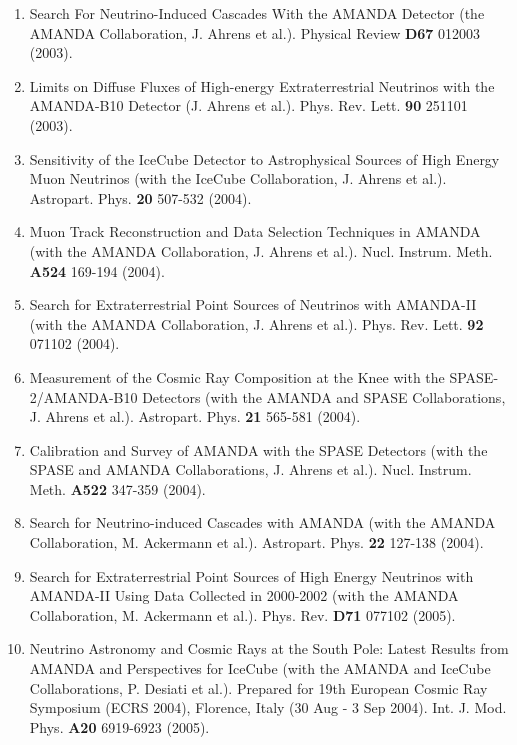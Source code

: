 \begin{enumerate}
\item Search For Neutrino-Induced Cascades With the AMANDA Detector
  (the AMANDA Collaboration, J. Ahrens et al.).  Physical Review {\bf
  D67} 012003 (2003).

\item Limits on Diffuse Fluxes of High-energy Extraterrestrial
  Neutrinos with the AMANDA-B10 Detector (J. Ahrens et al.).
  Phys. Rev. Lett. {\bf 90} 251101 (2003).

\item Sensitivity of the IceCube Detector to Astrophysical Sources of
  High Energy Muon Neutrinos (with the IceCube Collaboration,
  J. Ahrens et al.).  Astropart. Phys. {\bf 20} 507-532 (2004).

\item Muon Track Reconstruction and Data Selection Techniques in
  AMANDA (with the AMANDA Collaboration, J. Ahrens et al.).
  Nucl. Instrum. Meth. {\bf A524} 169-194 (2004).

\item Search for Extraterrestrial Point Sources of Neutrinos with
  AMANDA-II (with the AMANDA Collaboration, J. Ahrens et al.).
  Phys. Rev. Lett. {\bf 92} 071102 (2004).

\item Measurement of the Cosmic Ray Composition at the Knee with the
  SPASE-2/AMANDA-B10 Detectors (with the AMANDA and SPASE
  Collaborations, J. Ahrens et al.).  Astropart. Phys. {\bf 21}
  565-581 (2004).

\item Calibration and Survey of AMANDA with the SPASE Detectors (with
  the SPASE and AMANDA Collaborations, J. Ahrens et al.).
  Nucl. Instrum. Meth. {\bf A522} 347-359 (2004).

\item Search for Neutrino-induced Cascades with AMANDA (with the
  AMANDA Collaboration, M. Ackermann et al.).  Astropart. Phys. {\bf
    22} 127-138 (2004).

\item Search for Extraterrestrial Point Sources of High Energy
  Neutrinos with AMANDA-II Using Data Collected in 2000-2002 (with the
  AMANDA Collaboration, M. Ackermann et al.).  Phys. Rev. {\bf D71}
  077102 (2005).

\item Neutrino Astronomy and Cosmic Rays at the South Pole: Latest
  Results from AMANDA and Perspectives for IceCube (with the AMANDA
  and IceCube Collaborations, P. Desiati et al.).  Prepared for 19th
  European Cosmic Ray Symposium (ECRS 2004), Florence, Italy (30 Aug -
  3 Sep 2004).  Int. J. Mod. Phys. {\bf A20} 6919-6923 (2005).


\end{enumerate}
